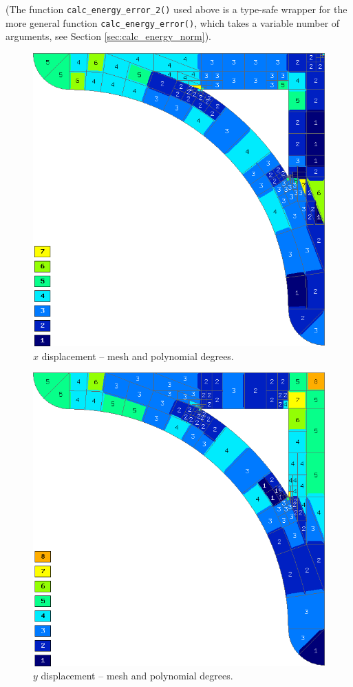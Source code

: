 (The function \verb"calc_energy_error_2()" used above is a type-safe wrapper for the 
more general function \verb"calc_energy_error()", which takes a variable number of arguments,
see Section \ref{sec:calc_energy_norm}).

\begin{figure}[p]
  \medskip \centering
  \includegraphics[height=0.43\textheight]{img/sys-xorders.png}
  \caption{$x$ displacement -- mesh and polynomial degrees.}
  \label{fig:sys-xorders}
\end{figure}

\begin{figure}[p]
  \medskip \centering
  \includegraphics[height=0.43\textheight]{img/sys-yorders.png}
  \caption{$y$ displacement -- mesh and polynomial degrees.}
  \label{fig:sys-yorders}
\end{figure}

